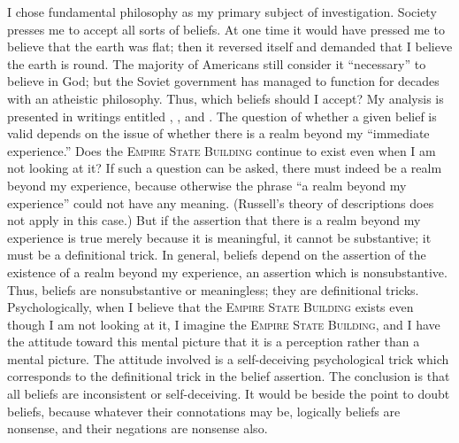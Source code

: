 I chose fundamental philosophy as my primary subject of investigation. 
Society presses me to accept all sorts of beliefs. At one time it would have 
pressed me to believe that the earth was flat; then it reversed itself and 
demanded that I believe the earth is round. The majority of Americans still 
consider it \enquote{necessary} to believe in God; but the Soviet government has 
managed to function for decades with an atheistic philosophy. Thus, which 
beliefs should I accept? My analysis is presented in writings entitled 
, , and 
. 
The question of whe\-ther a given belief is valid 
depends on the issue of whether there is a realm beyond my \enquote{immediate 
experience.} Does the \textsc{Empire State Building} continue to exist even when I 
am not looking at it? If such a question can be asked, there must indeed be 
a realm beyond my experience, because otherwise the phrase \enquote{a realm 
beyond my experience} could not have any meaning. (Russell's theory of 
descriptions does not apply in this case.) But if the assertion that there is a 
realm beyond my experience is true merely because it is meaningful, it 
cannot be substantive; it must be a definitional trick. In general, beliefs 
depend on the assertion of the existence of a realm beyond my experience, 
an assertion which is nonsubstantive. Thus, beliefs are nonsubstantive or 
meaningless; they are definitional tricks. Psychologically, when I believe that 
the \textsc{Empire State Building} exists even though I am not looking at it, I 
imagine the \textsc{Empire State Building}, and I have the attitude toward this 
mental picture that it is a perception rather than a mental picture. The 
attitude involved is a self-deceiving psychological trick which corresponds to 
the definitional trick in the belief assertion. The conclusion is that all beliefs 
are inconsistent or self-deceiving. It would be beside the point to doubt 
beliefs, because whatever their connotations may be, logically beliefs are 
nonsense, and their negations are nonsense also. 

